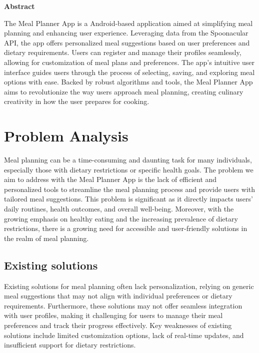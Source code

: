 \documentclass[12pt]{article}
\begin{document}
\clearpage\thispagestyle{empty}

	\vspace{1cm}
		\begin{center}
\textbf{Abstract}\\
		\end{center}
	\vspace{1cm}
{\normalsize The Meal Planner App is a Android-based application aimed at simplifying meal planning and enhancing user experience. Leveraging data from the Spoonacular API, the app offers personalized meal suggestions based on user preferences and dietary requirements. Users can register and manage their profiles seamlessly, allowing for customization of meal plans and preferences. The app's intuitive user interface guides users through the process of selecting, saving, and exploring meal options with ease. Backed by robust algorithms and tools, the Meal Planner App aims to revolutionize the way users approach meal planning, creating culinary creativity in how the user prepares for cooking.\par}
\clearpage\thispagestyle{empty}
\tableofcontents{}
\clearpage\thispagestyle{empty}

\section{Problem Analysis}\label{chap:introduction}
    \item Meal planning can be a time-consuming and daunting task for many individuals, especially those with dietary restrictions or specific health goals. The problem we aim to address with the Meal Planner App is the lack of efficient and personalized tools to streamline the meal planning process and provide users with tailored meal suggestions. This problem is significant as it directly impacts users' daily routines, health outcomes, and overall well-being. Moreover, with the growing emphasis on healthy eating and the increasing prevalence of dietary restrictions, there is a growing need for accessible and user-friendly solutions in the realm of meal planning.
\subsection{Existing solutions}
Existing solutions for meal planning often lack personalization, relying on generic meal suggestions that may not align with individual preferences or dietary requirements. Furthermore, these solutions may not offer seamless integration with user profiles, making it challenging for users to manage their meal preferences and track their progress effectively. Key weaknesses of existing solutions include limited customization options, lack of real-time updates, and insufficient support for dietary restrictions.
\end{document}
